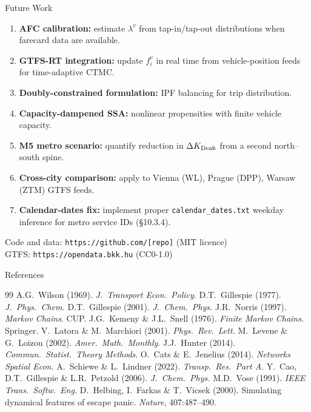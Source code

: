 \documentclass[aspectratio=169,12pt]{beamer}
\begin{document}
\begin{frame}{Future Work}
\begin{enumerate}
  \item \textbf{AFC calibration:} estimate $\lambda^v$ from tap-in/tap-out
    distributions when farecard data are available.
  \item \textbf{GTFS-RT integration:} update $f^v_i$ in real time from
    vehicle-position feeds for time-adaptive CTMC.
  \item \textbf{Doubly-constrained formulation:} IPF balancing for trip distribution.
  \item \textbf{Capacity-dampened SSA:} nonlinear propensities with finite vehicle
    capacity.
  \item \textbf{M5 metro scenario:} quantify reduction in
    $\Delta K_{\rm Deak}$ from a second north--south spine.
  \item \textbf{Cross-city comparison:} apply to Vienna (WL), Prague (DPP),
    Warsaw (ZTM) GTFS feeds.
  \item \textbf{Calendar-dates fix:} implement proper \texttt{calendar\_dates.txt}
    weekday inference for metro service IDs (§10.3.4).
\end{enumerate}
\vspace{4pt}
\small
Code and data: \texttt{https://github.com/[repo]} (MIT licence)\\
GTFS: \texttt{https://opendata.bkk.hu} (CC0-1.0)
\end{frame}

\begin{frame}[allowframebreaks]{References}
\small
\begin{thebibliography}{99}
 A.G.\ Wilson (1969). \emph{J.\ Transport Econ.\ Policy}.
 D.T.\ Gillespie (1977). \emph{J.\ Phys.\ Chem.}
 D.T.\ Gillespie (2001). \emph{J.\ Chem.\ Phys.}
 J.R.\ Norris (1997). \emph{Markov Chains}. CUP.
 J.G.\ Kemeny \& J.L.\ Snell (1976). \emph{Finite Markov Chains}. Springer.
 V.\ Latora \& M.\ Marchiori (2001). \emph{Phys.\ Rev.\ Lett.}
 M.\ Levene \& G.\ Loizou (2002). \emph{Amer.\ Math.\ Monthly}.
 J.J.\ Hunter (2014). \emph{Commun.\ Statist.\ Theory Methods}.
 O.\ Cats \& E.\ Jenelius (2014). \emph{Networks Spatial Econ.}
 A.\ Schiewe \& L.\ Lindner (2022). \emph{Transp.\ Res.\ Part A}.
 Y.\ Cao, D.T.\ Gillespie \& L.R.\ Petzold (2006). \emph{J.\ Chem.\ Phys.}
 M.D.\ Vose (1991). \emph{IEEE Trans.\ Softw.\ Eng.}
 D.\ Helbing, I.\ Farkas \& T.\ Vicsek (2000).
  Simulating dynamical features of escape panic. \emph{Nature}, 407:487--490.
\end{thebibliography}
\end{frame}
\end{document}
